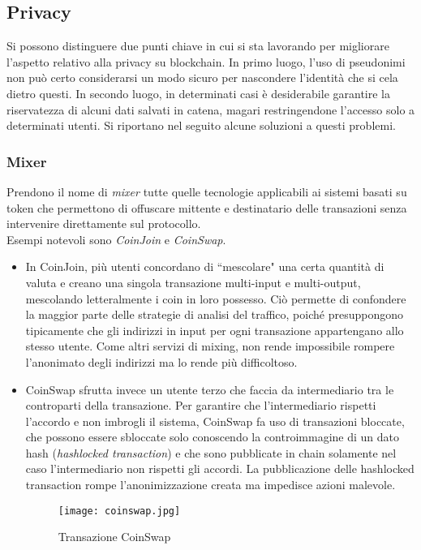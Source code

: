     \subsection{Privacy}
        Si possono distinguere due punti chiave in cui si sta lavorando per migliorare l'aspetto relativo alla privacy su blockchain. In primo luogo, l'uso di pseudonimi non può certo considerarsi un modo sicuro per nascondere l'identità che si cela dietro questi. In secondo luogo, in determinati casi è desiderabile garantire la riservatezza di alcuni dati salvati in catena, magari restringendone l'accesso solo a determinati utenti. Si riportano nel seguito alcune soluzioni a questi problemi.
        
        \subsubsection{Mixer}
            Prendono il nome di \emph{mixer} tutte quelle tecnologie applicabili ai sistemi basati su token che permettono di offuscare mittente e destinatario delle transazioni senza intervenire direttamente sul protocollo. \\
            Esempi notevoli sono \emph{CoinJoin} e \emph{CoinSwap}. \\
            \begin{itemize}
                \item In CoinJoin, più utenti concordano di ``mescolare" una certa quantità di valuta e creano una singola transazione multi-input e multi-output, mescolando letteralmente i coin in loro possesso. Ciò permette di confondere la maggior parte delle strategie di analisi del traffico, poiché presuppongono tipicamente che gli indirizzi in input per ogni transazione appartengano allo stesso utente. Come altri servizi di mixing, non rende impossibile rompere l'anonimato degli indirizzi ma lo rende più difficoltoso.
                \item CoinSwap sfrutta invece un utente terzo che faccia da intermediario tra le controparti della transazione. Per garantire che l'intermediario rispetti l'accordo e non imbrogli il sistema, CoinSwap fa uso di transazioni bloccate, che possono essere sbloccate solo conoscendo la controimmagine di un dato hash (\emph{hashlocked transaction}) e che sono pubblicate in chain solamente nel caso l'intermediario non rispetti gli accordi. La pubblicazione delle hashlocked transaction rompe l'anonimizzazione creata ma impedisce azioni malevole.
                \begin{figure}
                    \centering
                    \texttt{[image: coinswap.jpg]}
                    \caption{Transazione CoinSwap}
                    \label{fig:coinswap}
                \end{figure}
            \end{itemize}
        

